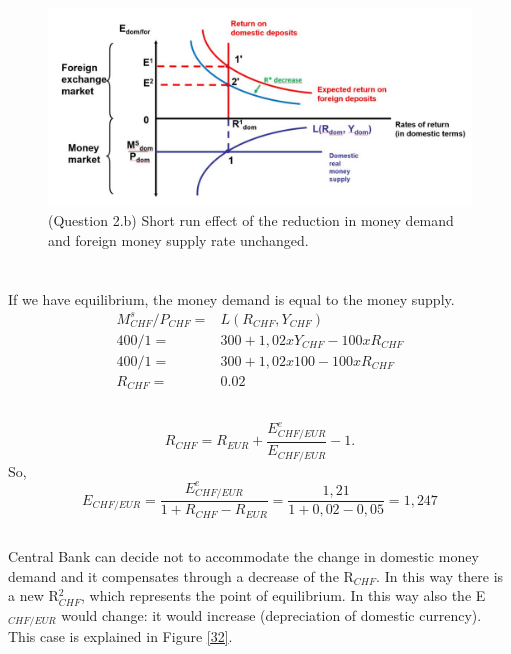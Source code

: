 \documentclass[	11pt, ]{fphw}
\begin{document}
\begin{figure}[h] 
\centering 
\includegraphics[scale=0.75]{22.JPG} 
\caption{(Question 2.b) Short run effect of the reduction in money demand and foreign money supply rate unchanged.} 
\label{22}
\end{figure}

\section{}
\subsection{}
If we have equilibrium, the money demand is equal to the money supply. 
\begin{align}
    M_{CHF}^{s}/P_{CHF} = & L ( R_{CHF}, Y_{CHF} ) \\
    400/1 =& 300+1,02 x Y_{CHF}- 100 x R_{CHF} \\
    400/1 =& 300+1,02 x 100 - 100x R_{CHF} \\
    R_{CHF} =&  0.02
\end{align}

\subsection{}
\[ R_{CHF}= R_{EUR} + \frac{E_{CHF/EUR}^{e}}{E_{CHF/EUR}} -1. \]
So,
\[ E_{CHF/EUR} = \frac{E_{CHF/EUR}^{e}}{1+R_{CHF}-R_{EUR}}= \frac{1,21}{1+0,02-0,05}=1,247 \]



\subsection{}
Central Bank can decide not to accommodate the change in domestic money demand and it compensates through a decrease of the R$_{CHF}$. In this way there is a new R$^{2}_{CHF}$, which represents the point of equilibrium. In this way also the E$_{CHF/EUR}$ would change: it would increase (depreciation of domestic currency). This case is explained in Figure \vref{32}.
\end{document}
